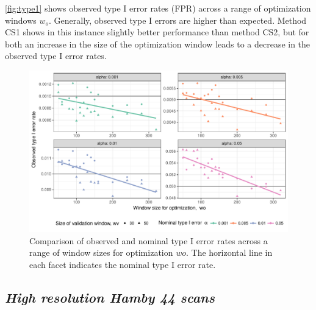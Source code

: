 \documentclass[12pt]{article}
\begin{document}
\autoref{fig:type1} shows observed type I error rates (FPR) across a
range of optimization windows \(w_o\). Generally, observed type I errors
are higher than expected. Method CS1 shows in this instance slightly
better performance than method CS2, but for both an increase in the size
of the optimization window leads to a decrease in the observed type I
error rates.

\begin{figure}

{\centering \includegraphics[width=\textwidth]{figures/type1-1} 

}

\caption{Comparison of observed and nominal type I error rates  across a range of window sizes for optimization $wo$. The horizontal line in each facet indicates the nominal type I error rate.}\label{fig:type1}
\end{figure}

\hypertarget{high-resolution-hamby-44-scans}{%
\subsection*{\texorpdfstring{\emph{High resolution Hamby 44
scans}}{High resolution Hamby 44 scans}}\label{high-resolution-hamby-44-scans}}
\end{document}
